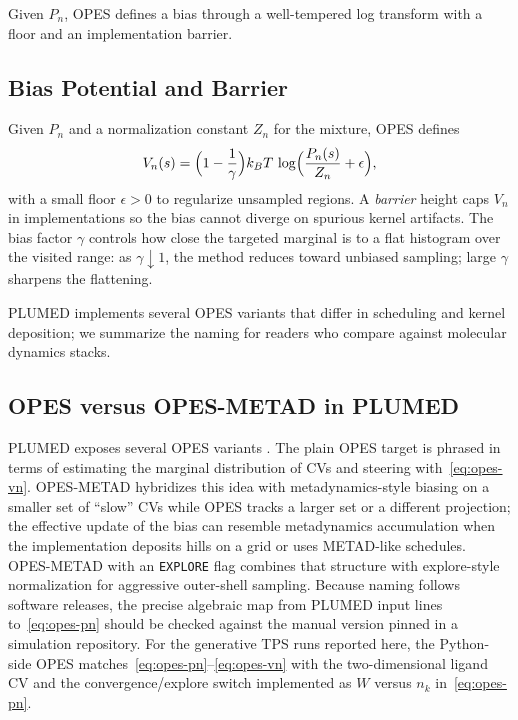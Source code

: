 Given $P_n$, OPES defines a bias through a well-tempered log transform with a
floor and an implementation barrier.

\subsection{Bias Potential and Barrier}

Given $P_n$ and a normalization constant $Z_n$ for the mixture, OPES defines
\begin{equation}
  \label{eq:opes-vn}
  V_n(s) = \Bigl(1 - \frac{1}{\gamma}\Bigr) k_BT\,
           \log\Bigl( \frac{P_n(s)}{Z_n} + \epsilon \Bigr),
\end{equation}
with a small floor $\epsilon > 0$ to regularize unsampled regions. A \emph{barrier} height caps $V_n$ in implementations so the bias cannot diverge on spurious kernel artifacts. The bias factor $\gamma$ controls how close the targeted marginal is to a flat histogram over the visited range: as $\gamma \downarrow 1$, the method reduces toward unbiased sampling; large $\gamma$ sharpens the flattening.

PLUMED implements several OPES variants that differ in scheduling and kernel
deposition; we summarize the naming for readers who compare against molecular
dynamics stacks.

\subsection{OPES versus OPES-METAD in PLUMED}

PLUMED exposes several OPES variants \citep{plumed2024}. The plain OPES target is phrased in terms of estimating the marginal distribution of CVs and steering with~\eqref{eq:opes-vn}. OPES-METAD hybridizes this idea with metadynamics-style biasing on a smaller set of ``slow'' CVs while OPES tracks a larger set or a different projection; the effective update of the bias can resemble metadynamics accumulation when the implementation deposits hills on a grid or uses METAD-like schedules. OPES-METAD with an \texttt{EXPLORE} flag combines that structure with explore-style normalization for aggressive outer-shell sampling. Because naming follows software releases, the precise algebraic map from PLUMED input lines to~\eqref{eq:opes-pn} should be checked against the manual version pinned in a simulation repository. For the generative TPS runs reported here, the Python-side OPES matches~\eqref{eq:opes-pn}--\eqref{eq:opes-vn} with the two-dimensional ligand CV and the convergence/explore switch implemented as $W$ versus $n_k$ in~\eqref{eq:opes-pn}.

